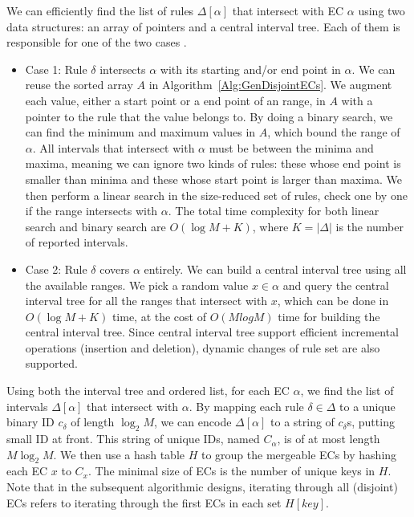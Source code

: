 We can efficiently find the list of rules $\Delta[\alpha]$ that intersect with EC $\alpha$ using two data structures: an array of pointers and a central interval tree.
Each of them is responsible for one of the two cases \cite{FindIntersectionWiki}.
\begin{itemize}
\item Case 1: Rule $\delta$ intersects $\alpha$ with its starting and/or end point in $\alpha$.
        We can reuse the sorted array $A$ in Algorithm~\ref{Alg:GenDisjointECs}.
        We augment each value, either a start point or a end point of an range, in $A$
        with a pointer to the rule that the value belongs to.
        By doing a binary search, we can find the minimum and maximum values in $A$,
        which bound the range of $\alpha$.
        All intervals that intersect with $\alpha$ must be between the minima and maxima,
        meaning we can ignore two kinds of rules: these whose end point is
        smaller than minima and these whose start point is larger than maxima.
        We then perform a linear search in the size-reduced set of rules,
        check one by one if the range intersects with $\alpha$.
        The total time complexity for both linear search and binary search are $O(\log M + K)$,
        where $K=|\Delta|$ is the number of reported intervals.
\item Case 2: Rule $\delta$ covers $\alpha$ entirely. We can build
        a central interval tree\cite{ComputationalGeometryBook} using all the available ranges.
        We pick a random value $x \in \alpha$ and query the central interval tree for
        all the ranges that intersect with $x$, which can be done in $O(\log M + K)$ time,
        at the cost of $O(M log M)$ time for building the central interval tree.
        Since central interval tree support efficient incremental operations (insertion and deletion),
        dynamic changes of rule set are also supported.
\end{itemize}

Using both the interval tree and ordered list, for each EC $\alpha$,
we find the list of intervals $\Delta[\alpha]$ that intersect with $\alpha$.
By mapping each rule $\delta \in \Delta$ to a unique binary ID $c_\delta$ of length $\log_2 M$,
we can encode $\Delta[\alpha]$ to a string of $c_\delta$s, putting small ID at front.
This string of unique IDs, named $C_\alpha$, is of at most length $M\log_2 M$.
We then use a hash table $H$ to group the mergeable ECs by hashing each EC $x$ to $C_x$.
The minimal size of ECs is the number of unique keys in $H$.
Note that in the subsequent algorithmic designs, iterating through all (disjoint) ECs refers to iterating through the first ECs in each set $H[key]$.%

